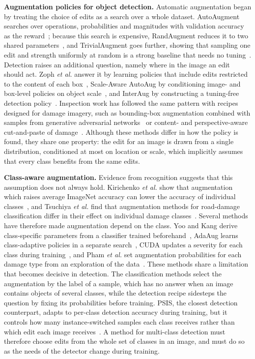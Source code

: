 \documentclass[conference]{IEEEtran}
\begin{document}
\noindent\textbf{Augmentation policies for object detection.} Automatic augmentation began by treating the choice of edits as a search over a whole dataset. AutoAugment searches over operations, probabilities and magnitudes with validation accuracy as the reward~\cite{cubuk2019auto}; because this search is expensive, RandAugment reduces it to two shared parameters~\cite{cubuk2020rand}, and TrivialAugment goes further, showing that sampling one edit and strength uniformly at random is a strong baseline that needs no tuning~\cite{muller2021trivial}. Detection raises an additional question, namely where in the image an edit should act. Zoph \emph{et al.} answer it by learning policies that include edits restricted to the content of each box~\cite{zoph2020det}, Scale-Aware AutoAug by conditioning image- and box-level policies on object scale~\cite{chen2021scale}, and InterAug by constructing a tuning-free detection policy~\cite{thopalli2023interaug}. Inspection work has followed the same pattern with recipes designed for damage imagery, such as bounding-box augmentation combined with samples from generative adversarial networks~\cite{aghayan2024} or content- and perspective-aware cut-and-paste of damage~\cite{rdd_cutpaste}. Although these methods differ in how the policy is found, they share one property: the edit for an image is drawn from a single distribution, conditioned at most on location or scale, which implicitly assumes that every class benefits from the same edits.

\noindent\textbf{Class-aware augmentation.} Evidence from recognition suggests that this assumption does not always hold. Kirichenko \emph{et al.} show that augmentation which raises average ImageNet accuracy can lower the accuracy of individual classes~\cite{kirichenko2023}, and Tsuchiya \emph{et al.} find that augmentation methods for road-damage classification differ in their effect on individual damage classes~\cite{tsuchiya2019}. Several methods have therefore made augmentation depend on the class. Yoo and Kang derive class-specific parameters from a classifier trained beforehand~\cite{yoo2023}, AdaAug learns class-adaptive policies in a separate search~\cite{cheung2022adaaug}, CUDA updates a severity for each class during training~\cite{ahn2023cuda}, and Pham \emph{et al.} set augmentation probabilities for each damage type from an exploration of the data~\cite{rdd_detectron2}. These methods share a limitation that becomes decisive in detection. The classification methods select the augmentation by the label of a sample, which has no answer when an image contains objects of several classes, while the detection recipe sidesteps the question by fixing its probabilities before training. PSIS, the closest detection counterpart, adapts to per-class detection accuracy during training, but it controls how many instance-switched samples each class receives rather than which edit each image receives~\cite{wang2019psis}. A method for multi-class detection must therefore choose edits from the whole set of classes in an image, and must do so as the needs of the detector change during training.
\end{document}
